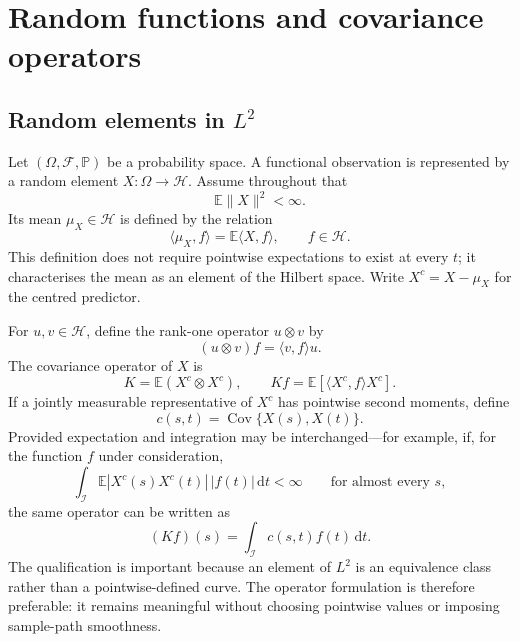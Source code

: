\section{Random functions and covariance operators}
\label{sec:random-functions-covariance}

\subsection{Random elements in \texorpdfstring{$L^2$}{L2}}

Let $(\Omega,\mathcal F,\mathbb P)$ be a probability space. A functional observation is represented by a random element $X:\Omega\rightarrow\mathcal H$. Assume throughout that
\begin{equation}
    \mathbb E\|X\|^2<\infty.
    \label{eq:finite-second-moment}
\end{equation}
Its mean $\mu_X\in\mathcal H$ is defined by the relation
\begin{equation}
    \langle\mu_X,f\rangle
    =\mathbb E\langle X,f\rangle,
    \qquad f\in\mathcal H.
    \label{eq:functional-mean}
\end{equation}
This definition does not require pointwise expectations to exist at every $t$; it characterises the mean as an element of the Hilbert space. Write $X^c=X-\mu_X$ for the centred predictor.

For $u,v\in\mathcal H$, define the rank-one operator $u\otimes v$ by
\begin{equation}
    (u\otimes v)f=\langle v,f\rangle u.
    \label{eq:tensor-operator}
\end{equation}
The covariance operator of $X$ is
\begin{equation}
    K=\mathbb E(X^c\otimes X^c),
    \qquad
    Kf=\mathbb E\!\left[\langle X^c,f\rangle X^c\right].
    \label{eq:covariance-operator}
\end{equation}
If a jointly measurable representative of $X^c$ has pointwise second moments,
define
\[
    c(s,t)=\operatorname{Cov}\{X(s),X(t)\}.
\]
Provided expectation and
integration may be interchanged---for example, if, for the function $f$ under
consideration,
\[
  \int_{\mathcal I}\mathbb E|X^c(s)X^c(t)|\,|f(t)|\,\mathrm dt<\infty
  \qquad\text{for almost every }s,
\]
the same operator can be written as
\begin{equation}
    (Kf)(s)=\int_{\mathcal I}c(s,t)f(t)\,\mathrm dt.
    \label{eq:covariance-integral-operator}
\end{equation}
The qualification is important because an element of $L^2$ is an equivalence
class rather than a pointwise-defined curve.  The operator formulation is
therefore preferable: it remains meaningful without choosing pointwise values
or imposing sample-path smoothness.

